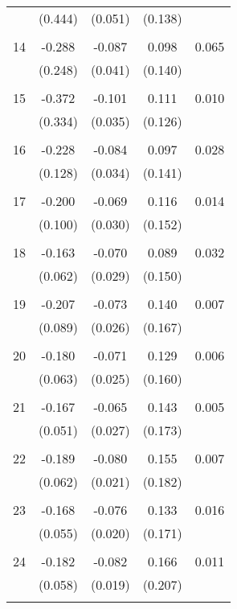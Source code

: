 \begin{tabular}{l*{1}{cccc}}
          & (0.444) & (0.051) & (0.138) & \\
 & & & &\\
  14       & -0.288 & -0.087 & 0.098 & 0.065 \\
          & (0.248) & (0.041) & (0.140) & \\
 & & & &\\
  15       & -0.372 & -0.101 & 0.111 & 0.010 \\
          & (0.334) & (0.035) & (0.126) & \\
 & & & &\\
  16       & -0.228 & -0.084 & 0.097 & 0.028 \\
          & (0.128) & (0.034) & (0.141) & \\
 & & & &\\
  17       & -0.200 & -0.069 & 0.116 & 0.014 \\
          & (0.100) & (0.030) & (0.152) & \\
 & & & &\\
  18       & -0.163 & -0.070 & 0.089 & 0.032 \\
          & (0.062) & (0.029) & (0.150) & \\
 & & & &\\
  19       & -0.207 & -0.073 & 0.140 & 0.007 \\
          & (0.089) & (0.026) & (0.167) & \\
 & & & &\\
  20       & -0.180 & -0.071 & 0.129 & 0.006 \\
          & (0.063) & (0.025) & (0.160) & \\
 & & & &\\
  21       & -0.167 & -0.065 & 0.143 & 0.005 \\
          & (0.051) & (0.027) & (0.173) & \\
 & & & &\\
  22       & -0.189 & -0.080 & 0.155 & 0.007 \\
          & (0.062) & (0.021) & (0.182) & \\
 & & & &\\
  23       & -0.168 & -0.076 & 0.133 & 0.016 \\
          & (0.055) & (0.020) & (0.171) & \\
 & & & &\\
  24       & -0.182 & -0.082 & 0.166 & 0.011 \\
          & (0.058) & (0.019) & (0.207) & \\
 & & & &\\

\end{tabular}
